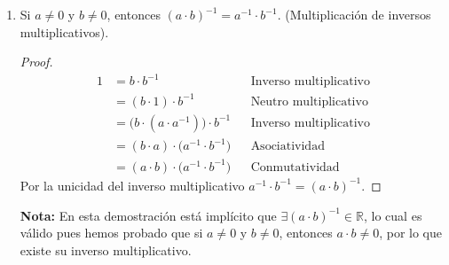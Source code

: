 \documentclass[11pt]{article}
\newcommand{\R}{\mathbb{R}}
\begin{document}
\begin{enumerate}[label=\alph*)]
 \item Si $a\neq 0$ y $b\neq 0$, entonces $(a \cdot b)^{-1}=a^{-1} \cdot b^{-1}$. (Multiplicación de inversos multiplicativos).
 \begin{proof} 
 \begin{align*}
  1 &= b\cdot b^{-1} && \text{Inverso multiplicativo}\\
  &= (b\cdot 1) \cdot b^{-1} && \text{Neutro multiplicativo}\\
  &= \bigl(b\cdot (a\cdot a^{-1})\bigr) \cdot b^{-1} && \text{Inverso multiplicativo}\\
  &= (b\cdot a) \cdot \bigl(a^{-1} \cdot b^{-1}\bigr) && \text{Asociatividad}\\
  &= (a\cdot b) \cdot \bigl(a^{-1} \cdot b^{-1}\bigr) && \text{Conmutatividad}
 \end{align*} Por la unicidad del inverso multiplicativo $a^{-1} \cdot b^{-1}=(a\cdot b)^{-1}$.
 \end{proof}
 \textbf{Nota:} En esta demostración está implícito que $\exists (a\cdot b)^{-1}\in \R$, lo cual es válido pues hemos probado que si $a\neq 0$ y $b\neq 0$, entonces $a\cdot b\neq 0$, por lo que existe su inverso multiplicativo.




\end{enumerate}
\end{document}
